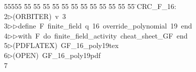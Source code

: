 %
%
\begin{tabbing}
55555 \= 55 \= 55 \= 55 \= 55 \= 55 \= 55 \= 55 \= 55 \= 55 \= 55 \= 55 \= 55 \= \>CRC\_F\_16:\\[0pt]
2\>$\triangleright$\>(ORBITER)\ v\ 3\ \\[0pt]
3\>$\triangleright$\>$\triangleright$\>define\ F\ finite\_field\ q\ 16\ override\_polynomial\ 19\ end\ \\[0pt]
4\>$\triangleright$\>$\triangleright$\>with\ F\ do\ finite\_field\_activity\ cheat\_sheet\_GF\ end\\[0pt]
5\>$\triangleright$\>(PDFLATEX)\ GF\_16\_poly19tex\\[0pt]
6\>$\triangleright$\>(OPEN)\ GF\_16\_poly19pdf\\[0pt]
7\>\end{tabbing}
